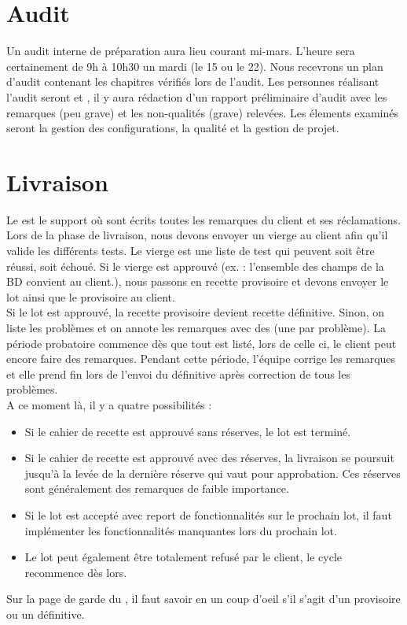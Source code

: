 \documentclass [a4paper] {article}
\begin{document}
\section{Audit}
Un audit interne de préparation aura lieu courant mi-mars. L'heure sera certainement de 9h à 10h30 un mardi (le 15 ou le 22). Nous recevrons un plan d'audit contenant les chapitres vérifiés lors de l'audit. Les personnes réalisant l'audit seront \nomTuteurQualite{} et \nomApprobateur{}, il y aura rédaction d'un rapport préliminaire d'audit avec les remarques (peu grave) et les non-qualités (grave) relevées. Les élements examinés seront la gestion des configurations, la qualité et la gestion de projet.


\section{Livraison}
Le \CDR{} est le support où sont écrits toutes les remarques du client et ses réclamations. Lors de la phase de livraison, nous devons envoyer un \CDR{} vierge au client afin qu'il valide les différents tests. Le \CDR{} vierge est une liste de test qui peuvent soit être réussi, soit échoué. Si le \CDR{} vierge est approuvé (ex. : l'ensemble des champs de la BD convient au client.), nous passons en recette provisoire et devons envoyer le lot ainsi que le \CDR{} provisoire au client.\\
Si le lot est approuvé, la recette provisoire devient recette définitive. Sinon, on liste les problèmes et on annote les remarques avec des \FFT{} (une \FFTCourt{} par problème). La période probatoire commence dès que tout est listé, lors de celle ci, le client peut encore faire des remarques. Pendant cette période, l'équipe corrige les remarques et elle prend fin lors de l'envoi du \CDR{} définitive après correction de tous les problèmes.\\
A ce moment là, il y a quatre possibilités :
\begin{itemize}
\item Si le cahier de recette est approuvé sans réserves, le lot est terminé.
\item Si le cahier de recette est approuvé avec des réserves, la livraison se poursuit jusqu'à la levée de la dernière réserve qui vaut pour approbation. Ces réserves sont généralement des remarques de faible importance.
\item Si le lot est accepté avec report de fonctionnalités sur le prochain lot, il faut implémenter les fonctionnalités manquantes lors du prochain lot.
\item Le lot peut également être totalement refusé par le client, le cycle recommence dès lors.
\end{itemize}
Sur la page de garde du \CDR{}, il faut savoir en un coup d'oeil s'il s'agit d'un \CDR{} provisoire ou un \CDR{} définitive.
\end{document}
